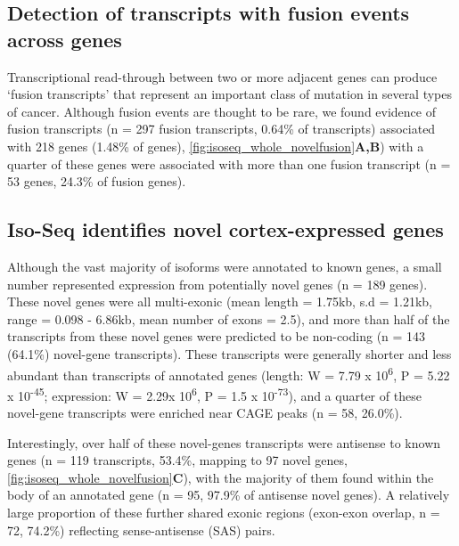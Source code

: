 \subsection{Detection of transcripts with fusion events across genes}
\label{ch4:fusion_trans}
Transcriptional read-through between two or more adjacent genes can produce ‘fusion transcripts’ that represent an important class of mutation in several types of cancer\cite{McCartney2019}. Although fusion events are thought to be rare\cite{Akiva2006a}, we found evidence of fusion transcripts (n = 297 fusion transcripts, 0.64\% of transcripts) associated with 218 genes (1.48\% of genes), \cref{fig:isoseq_whole_novelfusion}\textbf{A,B}) with a quarter of these genes were associated with more than one fusion transcript (n = 53 genes, 24.3\% of fusion genes).

\subsection{Iso-Seq identifies novel cortex-expressed genes}
\label{sec:whole_novelgenes}
Although the vast majority of isoforms were annotated to known genes, a small number represented expression from potentially novel genes (n = 189 genes).  These novel genes were all multi-exonic (mean length = 1.75kb, s.d = 1.21kb, range = 0.098 - 6.86kb, mean number of exons = 2.5), and more than half of the transcripts from these novel genes were predicted to be non-coding (n = 143 (64.1\%) novel-gene transcripts). These transcripts were generally shorter and less abundant than transcripts of annotated genes (length: W = 7.79 x 10\textsuperscript{6}, P = 5.22 x 10\textsuperscript{-45}; expression: W = 2.29x 10\textsuperscript{6}, P = 1.5 x 10\textsuperscript{-73}), and a quarter of these novel-gene transcripts were enriched near CAGE peaks (n = 58, 26.0\%). 

Interestingly, over half of these novel-genes transcripts were antisense to known genes (n = 119 transcripts, 53.4\%, mapping to 97 novel genes, \cref{fig:isoseq_whole_novelfusion}\textbf{C}), with the majority of them found within the body of an annotated gene (n = 95, 97.9\% of antisense novel genes). A relatively large proportion of these further shared exonic regions (exon-exon overlap, n = 72, 74.2\%) reflecting sense-antisense (SAS) pairs. 


